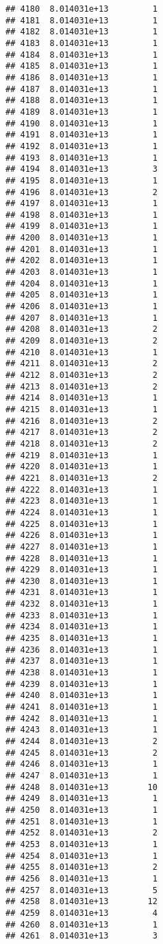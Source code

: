 \documentclass[
]{article}
\begin{document}
\begin{verbatim}
## 4180  8.014031e+13         1
## 4181  8.014031e+13         1
## 4182  8.014031e+13         1
## 4183  8.014031e+13         1
## 4184  8.014031e+13         1
## 4185  8.014031e+13         1
## 4186  8.014031e+13         1
## 4187  8.014031e+13         1
## 4188  8.014031e+13         1
## 4189  8.014031e+13         1
## 4190  8.014031e+13         1
## 4191  8.014031e+13         1
## 4192  8.014031e+13         1
## 4193  8.014031e+13         1
## 4194  8.014031e+13         3
## 4195  8.014031e+13         1
## 4196  8.014031e+13         2
## 4197  8.014031e+13         1
## 4198  8.014031e+13         1
## 4199  8.014031e+13         1
## 4200  8.014031e+13         1
## 4201  8.014031e+13         1
## 4202  8.014031e+13         1
## 4203  8.014031e+13         1
## 4204  8.014031e+13         1
## 4205  8.014031e+13         1
## 4206  8.014031e+13         1
## 4207  8.014031e+13         1
## 4208  8.014031e+13         2
## 4209  8.014031e+13         2
## 4210  8.014031e+13         1
## 4211  8.014031e+13         2
## 4212  8.014031e+13         2
## 4213  8.014031e+13         2
## 4214  8.014031e+13         1
## 4215  8.014031e+13         1
## 4216  8.014031e+13         2
## 4217  8.014031e+13         2
## 4218  8.014031e+13         2
## 4219  8.014031e+13         1
## 4220  8.014031e+13         1
## 4221  8.014031e+13         2
## 4222  8.014031e+13         1
## 4223  8.014031e+13         1
## 4224  8.014031e+13         1
## 4225  8.014031e+13         1
## 4226  8.014031e+13         1
## 4227  8.014031e+13         1
## 4228  8.014031e+13         1
## 4229  8.014031e+13         1
## 4230  8.014031e+13         1
## 4231  8.014031e+13         1
## 4232  8.014031e+13         1
## 4233  8.014031e+13         1
## 4234  8.014031e+13         1
## 4235  8.014031e+13         1
## 4236  8.014031e+13         1
## 4237  8.014031e+13         1
## 4238  8.014031e+13         1
## 4239  8.014031e+13         1
## 4240  8.014031e+13         1
## 4241  8.014031e+13         1
## 4242  8.014031e+13         1
## 4243  8.014031e+13         1
## 4244  8.014031e+13         2
## 4245  8.014031e+13         2
## 4246  8.014031e+13         1
## 4247  8.014031e+13         1
## 4248  8.014031e+13        10
## 4249  8.014031e+13         1
## 4250  8.014031e+13         1
## 4251  8.014031e+13         1
## 4252  8.014031e+13         2
## 4253  8.014031e+13         1
## 4254  8.014031e+13         1
## 4255  8.014031e+13         2
## 4256  8.014031e+13         1
## 4257  8.014031e+13         5
## 4258  8.014031e+13        12
## 4259  8.014031e+13         4
## 4260  8.014031e+13         1
## 4261  8.014031e+13         3

\end{verbatim}
\end{document}
